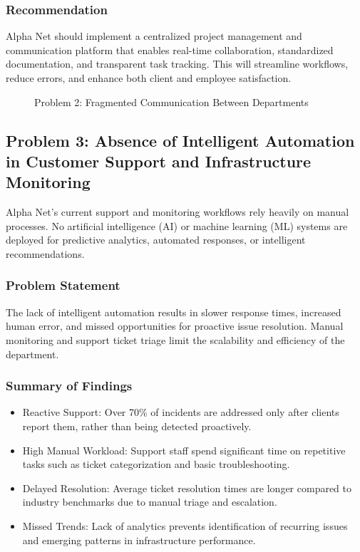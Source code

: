 \subsubsection*{Recommendation}
Alpha Net should implement a centralized project management and communication platform that enables real-time collaboration, standardized documentation, and transparent task tracking. This will streamline workflows, reduce errors, and enhance both client and employee satisfaction.

\begin{figure}[ht]
\centering

\caption{Problem 2: Fragmented Communication Between Departments}
\label{fig:problem2_flowchart}
\end{figure}

\subsection{Problem 3: Absence of Intelligent Automation in Customer Support and Infrastructure Monitoring}

Alpha Net's current support and monitoring workflows rely heavily on manual processes. No artificial intelligence (AI) or machine learning (ML) systems are deployed for predictive analytics, automated responses, or intelligent recommendations.

\subsubsection*{Problem Statement}
The lack of intelligent automation results in slower response times, increased human error, and missed opportunities for proactive issue resolution. Manual monitoring and support ticket triage limit the scalability and efficiency of the department.

\subsubsection*{Summary of Findings}
\begin{itemize}
    \item Reactive Support: Over 70\% of incidents are addressed only after clients report them, rather than being detected proactively.
    \item High Manual Workload: Support staff spend significant time on repetitive tasks such as ticket categorization and basic troubleshooting.
    \item Delayed Resolution: Average ticket resolution times are longer compared to industry benchmarks due to manual triage and escalation.
    \item Missed Trends: Lack of analytics prevents identification of recurring issues and emerging patterns in infrastructure performance.
\end{itemize}

